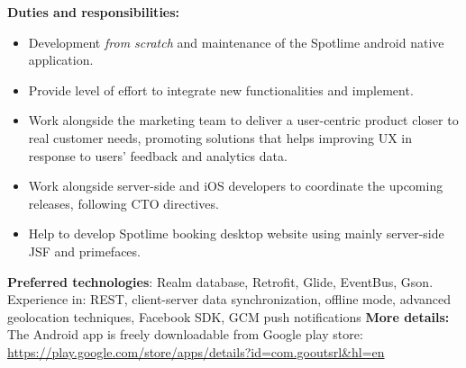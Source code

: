 \begin{cventries}
{   \newline
   \textbf{Duties and responsibilities:}
   \begin{itemize}
      \item Development \emph{from scratch} and maintenance of the Spotlime android
	 native application.
      \item Provide level of effort to integrate new functionalities and
	implement. 
      \item 
   Work alongside the marketing team to deliver a user-centric product closer
   to real customer 
   needs, promoting solutions that helps improving UX in response
   to users' feedback and analytics data.
      \item 
   Work alongside server-side and iOS developers to coordinate the upcoming
   releases, following CTO directives.
\item Help to develop Spotlime booking desktop website using mainly server-side JSF and
   primefaces.
\end{itemize}
\textbf{Preferred technologies}: Realm database, Retrofit, Glide, EventBus,
Gson.
   Experience in: REST, client-server data synchronization, offline mode,
   advanced geolocation techniques, Facebook SDK, GCM push notifications
   \newline
   \textbf{More details:}
   The Android app is freely downloadable from Google play store: 
   \url{https://play.google.com/store/apps/details?id=com.gooutsrl&hl=en}
}


\end{cventries}
